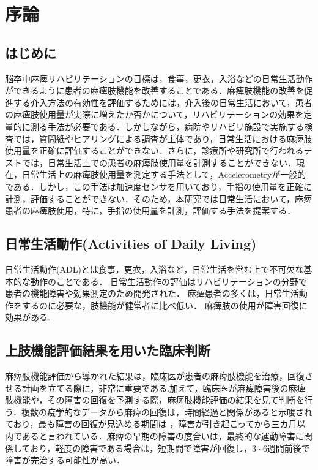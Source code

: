 \chapter{序論}

\section{はじめに}
脳卒中麻痺リハビリテーションの目標は，食事，更衣，入浴などの日常生活動作ができるように患者の麻痺肢機能を改善することである．麻痺肢機能の改善を促進する介入方法の有効性を評価するためには，介入後の日常生活において，患者の麻痺肢使用量が実際に増えたか否かについて，リハビリテーションの効果を定量的に測る手法が必要である．しかしながら，病院やリハビリ施設で実施する検査では，質問紙やヒアリングによる調査が主体であり，日常生活における麻痺肢使用量を正確に評価することができない．さらに，診療所や研究所で行われるテストでは，日常生活上での患者の麻痺肢使用量を計測することができない．現在，日常生活上の麻痺肢使用量を測定する手法として，Accelerometryが一般的である．しかし，この手法は加速度センサを用いており，手指の使用量を正確に計測，評価することができない．そのため，本研究では日常生活において，麻痺患者の麻痺肢使用，特に，手指の使用量を計測，評価する手法を提案する．

\section{日常生活動作(Activities of Daily Living)}
日常生活動作(ADL)とは食事，更衣，入浴など，日常生活を営む上で不可欠な基本的な動作のことである．
日常生活動作の評価はリハビリテーションの分野で患者の機能障害や効果測定のため開発された．
麻痺患者の多くは，日常生活動作をするのに必要な，肢機能が健常者に比べ低い．
麻痺肢の使用が障害回復に効果がある\cite{Zeiler2017}.




\section{上肢機能評価結果を用いた臨床判断}
麻痺肢機能評価から導かれた結果は，臨床医が患者の麻痺肢機能を治療，回復させる計画を立てる際に，非常に重要である\cite{Lang2013}.加えて，臨床医が麻痺障害後の麻痺肢機能や，その障害の回復を予測する際，麻痺肢機能評価の結果を見て判断を行う．複数の疫学的なデータから麻痺の回復は，時間経過と関係があると示唆されており，最も障害の回復が見込める期間は
，障害が引き起こってから三カ月以内であると言われている．麻痺の早期の障害の度合いは，最終的な運動障害に関係しており，軽度の障害である場合は，短期間で障害が回復し，3$\sim$6週間前後で障害が完治する可能性が高い．


